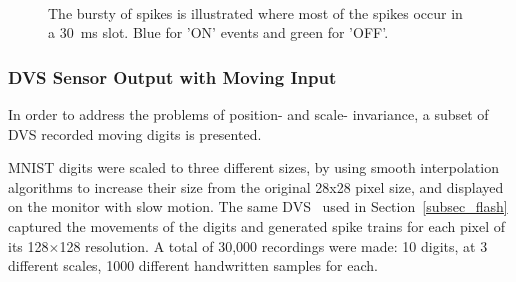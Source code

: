 	\begin{figure}[b!]
	  \centering
	  	  \\

	  \caption{The bursty of spikes is illustrated where most of the spikes occur in a 30~ms slot. Blue for 'ON' events and green for 'OFF'.}
	  \label{fig:flash}
	\end{figure}
	\subsubsection{DVS Sensor Output with Moving Input}
	In order to address the problems of position- and scale- invariance, a subset of DVS recorded moving digits is presented.
	
	MNIST digits were scaled to three different sizes, by using smooth interpolation algorithms to increase their size from the original 28x28 pixel size, and displayed on the monitor with slow motion. 
	The same DVS~\citep{serrano2013128} used in Section~\ref{subsec_flash} captured the movements of the digits and generated spike trains for each pixel of its 128$\times$128 resolution.
	A total of 30,000 recordings were made: 10 digits, at 3 different scales, 1000 different handwritten samples for each.
	